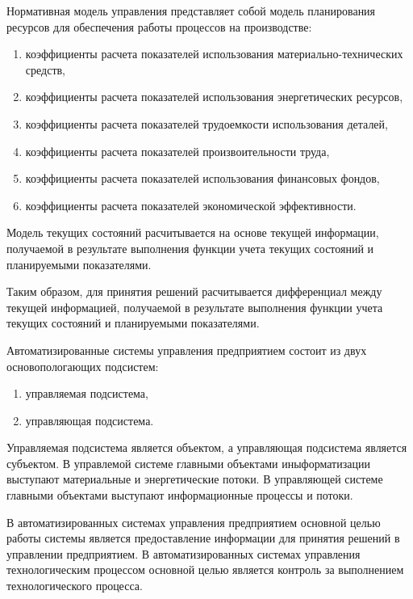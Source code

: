 Нормативная модель управления представляет собой модель планирования ресурсов для обеспечения работы процессов на производстве:
\begin{enumerate}
	\item коэффициенты расчета показателей использования материально-технических средств,
	\item коэффициенты расчета показателей использования энергетических ресурсов,
	\item коэффициенты расчета показателей трудоемкости использования деталей,
	\item коэффициенты расчета показателей произвоительности труда,
	\item коэффициенты расчета показателей использования финансовых фондов,
	\item коэффициенты расчета показателей экономической эффективности.
\end{enumerate}

Модель текущих состояний расчитывается на основе текущей информации, получаемой в результате выполнения функции учета текущих состояний и планируемыми показателями.

Таким образом, для принятия решений расчитывается дифференциал между текущей информацией, получаемой в результате выполнения функции учета текущих состояний и планируемыми показателями.

Автоматизированные системы управления предприятием состоит из двух основопологающих подсистем:
\begin{enumerate}
	\item управляемая подсистема,
	\item управляющая подсистема.
\end{enumerate}
Управляемая подсистема является объектом, а управляющая подсистема является субъектом. В управлемой системе главными объектами иныформатизации выступают материальные и энергетические потоки. В управляющей системе главными объектами выступают информационные процессы и потоки.

В автоматизированных системах управления предприятием основной целью работы системы является предоставление информации для принятия решений в управлении предприятием. В автоматизированных системах управления технологическим процессом основной целью является контроль за выполнением технологического процесса.

